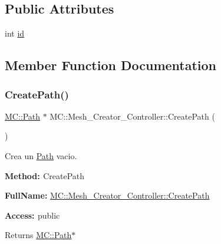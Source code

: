 \subsection*{Public Attributes}
\begin{DoxyCompactItemize}
\item 
int \mbox{\hyperlink{class_m_c_1_1_mesh___creator___controller_add6a4dc53dc9e52cd7897986c5e743da}{id}}
\end{DoxyCompactItemize}


\subsection{Member Function Documentation}
\mbox{\label{class_m_c_1_1_mesh___creator___controller_abbac03a7390bacd9a804c46e64e431ba}} 
\subsubsection{\texorpdfstring{CreatePath()}{CreatePath()}\hspace{0.1cm}{\footnotesize\ttfamily [1/2]}}
{\footnotesize\ttfamily \mbox{\hyperlink{class_m_c_1_1_path}{M\+C\+::\+Path}} $\ast$ M\+C\+::\+Mesh\+\_\+\+Creator\+\_\+\+Controller\+::\+Create\+Path (\begin{DoxyParamCaption}{ }\end{DoxyParamCaption})}



Crea un \mbox{\hyperlink{class_m_c_1_1_path}{Path}} vacio. 

{\bfseries{Method\+: }} Create\+Path

{\bfseries{Full\+Name\+:}} \mbox{\hyperlink{class_m_c_1_1_mesh___creator___controller_abbac03a7390bacd9a804c46e64e431ba}{M\+C\+::\+Mesh\+\_\+\+Creator\+\_\+\+Controller\+::\+Create\+Path}}

{\bfseries{Access\+: }} public \begin{DoxyReturn}{Returns}
\mbox{\hyperlink{class_m_c_1_1_path}{M\+C\+::\+Path}}$\ast$ 
\end{DoxyReturn}
\mbox{\label{class_m_c_1_1_mesh___creator___controller_aa3b4c3f287eacdc76b53763c15ae63e3}} 
